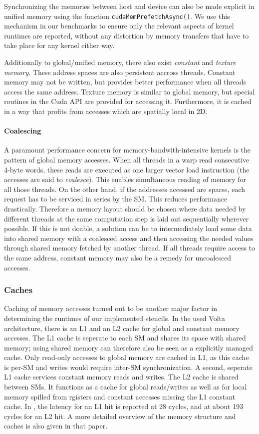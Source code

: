 Synchronizing the memories between host and device can also be made explicit in unified memory using the function \texttt{cudaMemPrefetchAsync()}. We use this mechanism in our benchmarks to ensure only the relevant aspects of kernel runtimes are reported, without any distortion by memory transfers that have to take place for any kernel either way.

Additionally to global/unified memory, there also exist \emph{constant} and \emph{texture memory}. These address spaces are also persistent accross threads. Constant memory may not be written, but provides better performance when all threads access the same address. Texture memory is similar to global memory, but special routines in the Cuda API are provided for accessing it. Furthermore, it is cached in a way that profits from accesses which are spatially local in 2D.

\paragraph{Coalescing} A paramount performance concern for memory-bandwith-intensive kernels is the pattern of global memory accesses. When all threads in a warp read consecutive 4-byte words, these reads are executed as one larger vector load instruction (the accesses are said to \emph{coalesce}). This enables simultaneous reading of memory for all those threads. On the other hand, if the addresses accessed are sparse, each request has to be serviced in series by the SM. This reduces performance drastically. Therefore a memory layout should be chosen where data needed by different threads at the same computation step is laid out sequentially wherever possible. If this is not doable, a solution can be to intermediately load some data into shared memory with a coalesced access and then accessing the needed values through shared memory fetched by another thread. If all threads require access to the same address, constant memory may also be a remedy for uncoalesced accesses.

\subsubsection{Caches} Caching of memory accesses turned out to be another major factor in determining the runtimes of our implemented stencils. In the used Volta architecture, there is an L1 and an L2 cache for global and constant memory accesses. The L1 cache is seperate to each SM and shares its space with shared memory; using shared memory can therefore also be seen as a explicitly managed cache. Only read-only accesses to global memory are cached in L1, as this cache is per-SM and writes would require inter-SM synchronization. A second, seperate L1 cache services constant memory reads and writes. The L2 cache is shared between SMs. It functions as a cache for global reads/writes as well as for local memory spilled from rgisters and constant accesses missing the L1 constant cache. In \cite[Chapter 3]{dissecting}, the latency for an L1 hit is reported at 28 cycles, and at about 193 cycles for an L2 hit. A more detailed overview of the memory structure and caches is also given in that paper.

